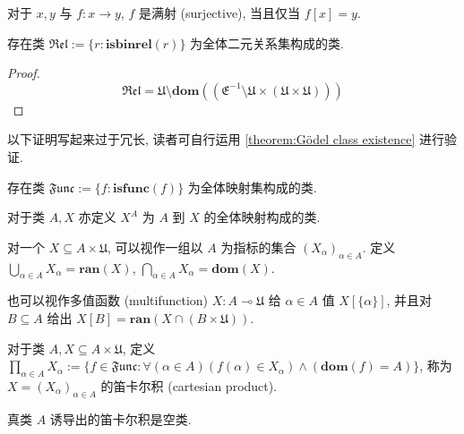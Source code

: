 \begin{definition}
    \label {definition:surjective (set)}
    对于 \(x,y\) 与 \(f : x \to y\), \(f\) 是满射 (surjective), 当且仅当 \(f[x] = y\).
\end{definition}

\begin{definition}
    存在类 \(\mathfrak{Rel} := \{r : \mathbf{isbinrel} (r)\}\) 为全体二元关系集构成的类.

    \begin{proof}
        \[
            \mathfrak{Rel} = \mathfrak{U} \setminus \mathbf{dom} ((\mathfrak{E}^{-1} \setminus \mathfrak{U} \times (\mathfrak{U} \times \mathfrak{U})))
        \]
    \end{proof}
\end{definition}

以下证明写起来过于冗长, 读者可自行运用 \ref{theorem:Gödel class existence} 进行验证.

\begin{definition}
    存在类 \(\mathfrak{Func} := \{f : \mathbf{isfunc} (f)\}\) 为全体映射集构成的类.
\end{definition}

\begin{definition}
    对于类 \(A,X\) 亦定义 \(X^A\) 为 \(A\) 到 \(X\) 的全体映射构成的类.
\end{definition}

\begin{definition}
    对一个 \(X \subseteq A \times \mathfrak{U}\), 可以视作一组以 \(A\) 为指标的集合 \({(X_\alpha)}_{\alpha \in A}\).
    定义 \(\bigcup_{\alpha \in A} X_\alpha = \mathbf{ran} (X)\), \(\bigcap_{\alpha \in A} X_\alpha = \mathbf{dom} (X)\).

    也可以视作多值函数 (multifunction) \(X : A \multimap \mathfrak{U}\) 给 \(\alpha \in A\) 值 \(X[\{\alpha\}]\),
    并且对 \(B \subseteq A\) 给出 \(X[B] = \mathbf{ran} (X \cap (B \times \mathfrak{U}))\).
\end{definition}

\begin{definition}[笛卡尔积]
    \label {definition:cartesian product}
    对于类 \(A,X \subseteq A \times \mathfrak{U}\), 定义 \(\prod_{\alpha \in A} X_\alpha := \{f \in \mathfrak{Func} : \forall (\alpha \in A)(f(\alpha) \in X_\alpha) \land (\mathbf{dom} (f) = A)\}\), 称为 \(X = (X_\alpha)_{\alpha \in A}\) 的笛卡尔积 (cartesian product).
\end{definition}

真类 \(A\) 诱导出的笛卡尔积是空类.

